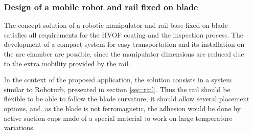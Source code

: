 \subsubsection{Design of a mobile robot and rail fixed on blade}\label{proj_rail}
The concept solution of a robotic manipulator and rail base fixed on blade
satisfies all requirements for the HVOF coating and the inspection process. The
development of a compact system for easy transportation and its installation on the arc
chamber are possible, since the manipulator dimensions are reduced due to the
extra mobility provided by the rail.


In the context of the proposed application, the solution consists in a system
similar to Roboturb, presented in section \ref{sec::rail}. Thus the rail should
be flexible to be able to follow the blade curvature, it should allow several
placement options, and, as the blade is not ferromagnetic, the adhesion would
be done by active suction cups made of a special material to work on large
temperature variations.



